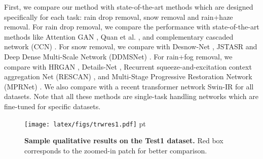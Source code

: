 \documentclass[10pt,twocolumn,letterpaper]{article}
\begin{document}
First, we compare our method with state-of-the-art methods which are designed specifically for each task: rain drop removal, snow removal and rain+haze removal. For rain drop removal, we compare the performance with state-of-the-art methods like Attention GAN \cite{qian2018attentive}, Quan et al. \cite{quan2019deep}, and complementary cascaded network (CCN) \cite{quan2021removing}. For snow removal, we compare with Desnow-Net \cite{liu2018desnownet}, JSTASR \cite{chen2020jstasr} and  Deep Dense Multi-Scale Network (DDMSNet) \cite{zhang2021deep}. For rain+fog removal, we compare with HRGAN \cite{li2019heavy}, Details-Net \cite{fu2017removing}, Recurrent squeeze-and-excitation context aggregation
Net (RESCAN) \cite{li2018recurrent}, and Multi-Stage Progressive Restoration Network (MPRNet) \cite{zamir2021multi}. We also compare with a recent transformer network Swin-IR \cite{liang2021swinir} for all datasets. Note that all these methods are single-task handling networks which are fine-tuned for specific datasets.

\begin{figure*}[]
	\centering
	\texttt{[image: latex/figs/trwres1.pdf]}
	 pt
	\caption{\textbf{Sample qualitative results on the Test1 dataset.}  Red box corresponds to the zoomed-in patch for better comparison.  }
	\label{test1res}
	\vspace{-1.8em}
\end{figure*}
\end{document}
